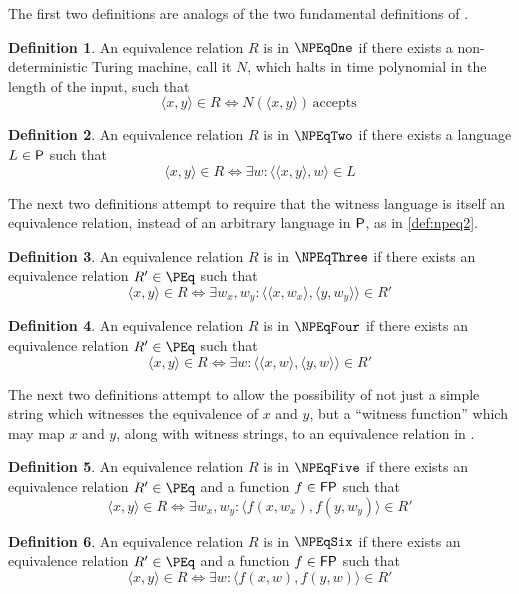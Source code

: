 \documentclass[draft]{article}
\theoremstyle{definition} \newtheorem{openproblem}[openproblem]{Open problem}
\theoremstyle{definition} \newtheorem{definition}[definition]{Definition}
\theoremstyle{remark} \newtheorem{remark}{Remark}
\newcommand{\plain}[1]{\,\text{#1}\,} %
\newcommand{\pair}[2]{\langle#1,#2\rangle} %
\begin{document}
The first two definitions are analogs of the two fundamental definitions of \NP.
\begin{definition}\label{def:npeq1}
  An equivalence relation $R$ is in $\NPEqOne$ if there exists a non-deterministic Turing machine, call it $N$, which halts in time polynomial in the length of the input, such that
  \begin{displaymath}
    \pair{x}{y}\in R\iff N(\pair{x}{y})\plain{accepts}
  \end{displaymath}
\end{definition}
\begin{definition}\label{def:npeq2}
  An equivalence relation $R$ is in $\NPEqTwo$ if there exists a language $L\in\P$ such that
  \begin{displaymath}
    \pair{x}{y}\in R\iff \exists w\colon \pair{\pair{x}{y}}{w}\in L
  \end{displaymath}
\end{definition}

The next two definitions attempt to require that the witness language is itself an equivalence relation, instead of an arbitrary language in $\P$, as in \autoref{def:npeq2}.
\begin{definition}\label{def:npeq3}
  An equivalence relation $R$ is in $\NPEqThree$ if there exists an equivalence relation $R'\in \PEq$ such that
  \begin{displaymath}
    \pair{x}{y}\in R\iff \exists w_x,w_y\colon \pair{\pair{x}{w_x}}{\pair{y}{w_y}}\in R'
  \end{displaymath}
\end{definition}
\begin{definition}\label{def:npeq4}
  An equivalence relation $R$ is in $\NPEqFour$ if there exists an equivalence relation $R'\in \PEq$ such that
  \begin{displaymath}
    \pair{x}{y}\in R\iff \exists w\colon \pair{\pair{x}{w}}{\pair{y}{w}}\in R'
  \end{displaymath}
\end{definition}

The next two definitions attempt to allow the possibility of not just a simple string which witnesses the equivalence of $x$ and $y$, but a ``witness function'' which may map $x$ and $y$, along with witness strings, to an equivalence relation in \PEq.
\begin{definition}\label{def:npeq5}
  An equivalence relation $R$ is in $\NPEqFive$ if there exists an equivalence relation $R'\in \PEq$ and a function $f\in\FP$ such that
  \begin{displaymath}
    \pair{x}{y}\in R\iff \exists w_x,w_y\colon \pair{f(x, w_x)}{f(y, w_y)}\in R'
  \end{displaymath}
\end{definition}
\begin{definition}\label{def:npeq6}
  An equivalence relation $R$ is in $\NPEqSix$ if there exists an equivalence relation $R'\in \PEq$ and a function $f\in\FP$ such that
  \begin{displaymath}
    \pair{x}{y}\in R\iff \exists w\colon \pair{f(x, w)}{f(y, w)}\in R'
  \end{displaymath}
\end{definition}
\end{document}
